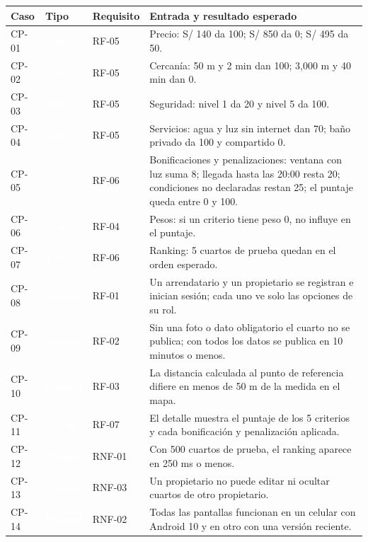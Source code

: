 \documentclass[11pt,a4paper]{article}
\newcommand{\etiqueta}[2]{{\setlength{\fboxsep}{2pt}\colorbox{#1}{\textcolor{white}{\scriptsize\bfseries #2}}}}
\begin{document}
\vspace{0.1cm}
{\footnotesize
\setlength{\tabcolsep}{3.5pt}
\noindent\begin{tabularx}{\textwidth}{@{}C{1.1cm} C{1.3cm} C{1.6cm} L@{}}
\toprule
{}
\textbf{Caso} & \textbf{Tipo} & \textbf{Requisito} & \textbf{Entrada y resultado esperado} \\
\midrule
CP-01 & \etiqueta{Rama2}{Jest} & RF-05 & Precio: S/ 140 da 100; S/ 850 da 0; S/ 495 da 50. \\
CP-02 & \etiqueta{Rama2}{Jest} & RF-05 & Cercanía: 50 m y 2 min dan 100; 3,000 m y 40 min dan 0. \\
CP-03 & \etiqueta{Rama2}{Jest} & RF-05 & Seguridad: nivel 1 da 20 y nivel 5 da 100. \\
CP-04 & \etiqueta{Rama2}{Jest} & RF-05 & Servicios: agua y luz sin internet dan 70; baño privado da 100 y compartido 0. \\
CP-05 & \etiqueta{Rama2}{Jest} & RF-06 & Bonificaciones y penalizaciones: ventana con luz suma 8; llegada hasta las 20:00 resta 20; condiciones no declaradas restan 25; el puntaje queda entre 0 y 100. \\
CP-06 & \etiqueta{Rama2}{Jest} & RF-04 & Pesos: si un criterio tiene peso 0, no influye en el puntaje. \\
CP-07 & \etiqueta{Rama2}{Jest} & RF-06 & Ranking: 5 cuartos de prueba quedan en el orden esperado. \\
CP-08 & \etiqueta{Rama4}{Manual} & RF-01 & Un arrendatario y un propietario se registran e inician sesión; cada uno ve solo las opciones de su rol. \\
CP-09 & \etiqueta{Rama4}{Manual} & RF-02 & Sin una foto o dato obligatorio el cuarto no se publica; con todos los datos se publica en 10 minutos o menos. \\
CP-10 & \etiqueta{Rama4}{Manual} & RF-03 & La distancia calculada al punto de referencia difiere en menos de 50 m de la medida en el mapa. \\
CP-11 & \etiqueta{Rama4}{Manual} & RF-07 & El detalle muestra el puntaje de los 5 criterios y cada bonificación y penalización aplicada. \\
CP-12 & \etiqueta{Rama4}{Manual} & RNF-01 & Con 500 cuartos de prueba, el ranking aparece en 250 ms o menos. \\
CP-13 & \etiqueta{Rama4}{Manual} & RNF-03 & Un propietario no puede editar ni ocultar cuartos de otro propietario. \\
CP-14 & \etiqueta{Rama4}{Manual} & RNF-02 & Todas las pantallas funcionan en un celular con Android 10 y en otro con una versión reciente. \\
\bottomrule
\end{tabularx}
}
\end{document}
